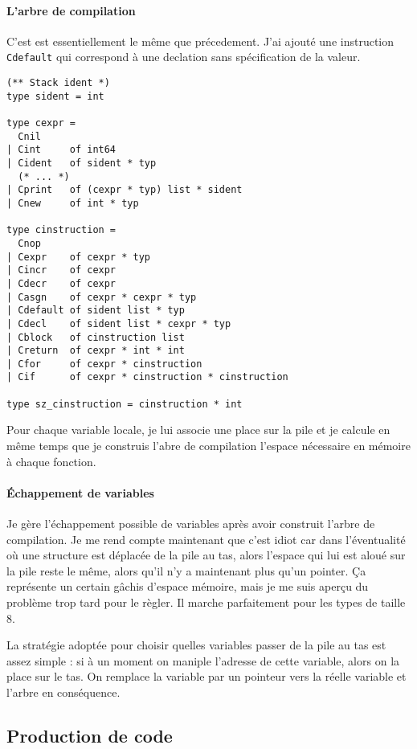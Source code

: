 \documentclass{article}
\begin{document}
\paragraph{L'arbre de compilation}

C'est est essentiellement le même que précedement. J'ai ajouté une instruction \texttt{Cdefault} qui correspond à une declation sans spécification de la valeur.

\begin{verbatim}
(** Stack ident *)
type sident = int

type cexpr =
  Cnil
| Cint     of int64
| Cident   of sident * typ
  (* ... *)
| Cprint   of (cexpr * typ) list * sident
| Cnew     of int * typ

type cinstruction =
  Cnop
| Cexpr    of cexpr * typ
| Cincr    of cexpr
| Cdecr    of cexpr
| Casgn    of cexpr * cexpr * typ
| Cdefault of sident list * typ
| Cdecl    of sident list * cexpr * typ
| Cblock   of cinstruction list
| Creturn  of cexpr * int * int
| Cfor     of cexpr * cinstruction
| Cif      of cexpr * cinstruction * cinstruction

type sz_cinstruction = cinstruction * int
\end{verbatim}

Pour chaque variable locale, je lui associe une place sur la pile et je calcule en même temps que je construis l'abre de compilation l'espace nécessaire en mémoire à chaque fonction.

\paragraph{Échappement de variables}

Je gère l'échappement possible de variables après avoir construit l'arbre de compilation. Je me rend compte maintenant que c'est idiot car dans l'éventualité où une structure est déplacée de la pile au tas, alors l'espace qui lui est aloué sur la pile reste le même, alors qu'il n'y a maintenant plus qu'un pointer. Ça représente un certain gâchis d'espace mémoire, mais je me suis aperçu du problème trop tard pour le règler. Il marche parfaitement pour les types de taille 8.

La stratégie adoptée pour choisir quelles variables passer de la pile au tas est assez simple : si à un moment on maniple l'adresse de cette variable, alors on la place sur le tas. On remplace la variable par un pointeur vers la réelle variable et l'arbre en conséquence.

\subsection{Production de code}
\end{document}
